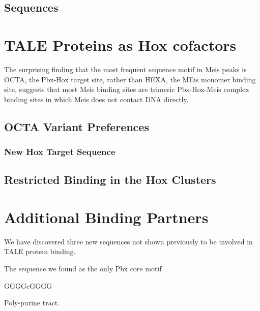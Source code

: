 
\subsection{Sequences}



\section{TALE Proteins as Hox cofactors}

The surprising finding that the most frequent sequence motif in Meis peaks is \ac{OCTA}, the Pbx-Hox target site, rather than \ac{HEXA}, the MEis monomer binding site, suggests that most Meis binding sites are trimeric Pbx-Hox-Meis complex binding sites in which Meis does not contact DNA directly. 

\subsection{OCTA Variant Preferences}



\subsubsection{New Hox Target Sequence}

\subsection{Restricted Binding in the Hox Clusters}



\section{Additional Binding Partners}

We have discovered three new sequences not shown previously to be involved in \ac{TALE} protein binding. 

The sequence we found as the only Pbx core motif

GGGGcGGGG

Poly-purine tract.
